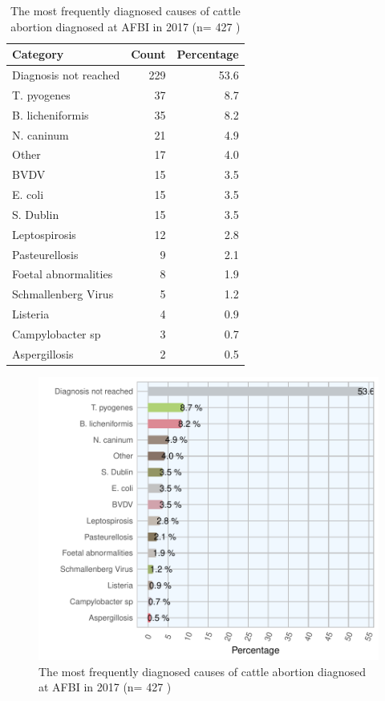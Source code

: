 \documentclass[]{book}
\begin{document}
\begin{table}

\caption{\label{tab:unnamed-chunk-34}The most frequently diagnosed causes of cattle abortion diagnosed at AFBI in 2017 (n= 427 )}
\centering
\begin{tabular}[t]{l|r|r}
\hline
Category & Count & Percentage\\
\hline
Diagnosis not reached & 229 & 53.6\\
\hline
T. pyogenes & 37 & 8.7\\
\hline
B. licheniformis & 35 & 8.2\\
\hline
N. caninum & 21 & 4.9\\
\hline
Other & 17 & 4.0\\
\hline
BVDV & 15 & 3.5\\
\hline
E. coli & 15 & 3.5\\
\hline
S. Dublin & 15 & 3.5\\
\hline
Leptospirosis & 12 & 2.8\\
\hline
Pasteurellosis & 9 & 2.1\\
\hline
Foetal abnormalities & 8 & 1.9\\
\hline
Schmallenberg Virus & 5 & 1.2\\
\hline
Listeria & 4 & 0.9\\
\hline
Campylobacter sp & 3 & 0.7\\
\hline
Aspergillosis & 2 & 0.5\\
\hline
\end{tabular}
\end{table}

\begin{figure}

{\centering \includegraphics{AFBI_files/figure-latex/unnamed-chunk-35-1} 

}

\caption{The most frequently diagnosed causes of cattle abortion diagnosed at AFBI in 2017 (n= 427 )}\label{fig:unnamed-chunk-35}
\end{figure}
\end{document}
